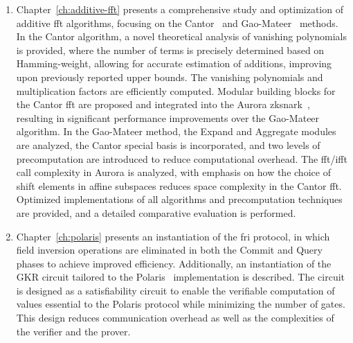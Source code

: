 \begin{enumerate}
\item Chapter~\ref{ch:additive-fft} presents a comprehensive study and optimization of additive \gls{fft} algorithms, focusing on the Cantor~\cite{Cantor1989FFT} and Gao-Mateer~\cite{Gao2010FFT} methods. In the Cantor algorithm, a novel theoretical analysis of vanishing polynomials is provided, where the number of terms is precisely determined based on Hamming-weight, allowing for accurate estimation of additions, improving upon previously reported upper bounds. The vanishing polynomials and multiplication factors are efficiently computed. Modular building blocks for the Cantor \gls{fft} are proposed and integrated into the Aurora \gls{zksnark}~\cite{libiop}, resulting in significant performance improvements over the Gao-Mateer algorithm. In the Gao-Mateer method, the \textsf{Expand} and \textsf{Aggregate} modules are analyzed, the Cantor special basis is incorporated, and two levels of precomputation are introduced to reduce computational overhead. The \gls{fft}/\gls{ifft} call complexity in Aurora is analyzed, with emphasis on how the choice of shift elements in affine subspaces reduces space complexity in the Cantor \gls{fft}. Optimized \CC implementations of all algorithms and precomputation techniques are provided, and a detailed comparative evaluation is performed.

\item Chapter~\ref{ch:polaris} presents an instantiation of the \gls{fri} protocol, in which field inversion operations are eliminated in both the Commit and Query phases to achieve improved efficiency. Additionally, an instantiation of the GKR circuit tailored to the Polaris~\cite{Polaris} implementation is described. The circuit is designed as a satisfiability circuit to enable the verifiable computation of values essential to the Polaris protocol while minimizing the number of gates. This design reduces communication overhead as well as the complexities of the verifier and the prover.


\end{enumerate}
